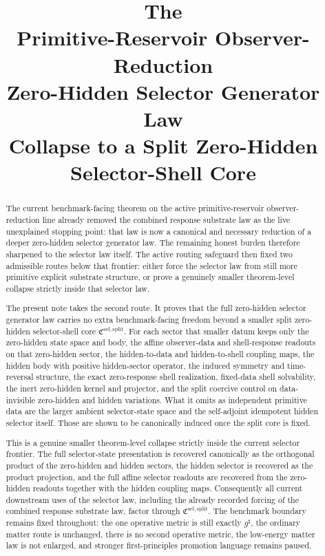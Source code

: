 \documentclass[11pt]{article}
\title{\textbf{The \TheoryName{}}\\[0.4em]
\large Primitive-Reservoir Observer-Reduction\\
\large Zero-Hidden Selector Generator Law\\
\large Collapse to a Split Zero-Hidden Selector-Shell Core}
\author{}
\date{}
\newcommand{\CompletedMetric}{g^{\sharp}}
\newcommand{\SelectorCore}{\mathfrak C^{\mathrm{sel,split}}}
\begin{document}
\maketitle

\begin{abstract}
The current benchmark-facing theorem on the active primitive-reservoir observer-reduction line already removed the combined response substrate law as the live unexplained stopping point: that law is now a canonical and necessary reduction of a deeper zero-hidden selector generator law. The remaining honest burden therefore sharpened to the selector law itself. The active routing safeguard then fixed two admissible routes below that frontier: either force the selector law from still more primitive explicit substrate structure, or prove a genuinely smaller theorem-level collapse strictly inside that selector law.

The present note takes the second route. It proves that the full zero-hidden selector generator law carries no extra benchmark-facing freedom beyond a smaller split zero-hidden selector-shell core \(\SelectorCore\). For each sector that smaller datum keeps only the zero-hidden state space and body, the affine observer-data and shell-response readouts on that zero-hidden sector, the hidden-to-data and hidden-to-shell coupling maps, the hidden body with positive hidden-sector operator, the induced symmetry and time-reversal structure, the exact zero-response shell realization, fixed-data shell solvability, the inert zero-hidden kernel and projector, and the split coercive control on data-invisible zero-hidden and hidden variations. What it omits as independent primitive data are the larger ambient selector-state space and the self-adjoint idempotent hidden selector itself. Those are shown to be canonically induced once the split core is fixed.

This is a genuine smaller theorem-level collapse strictly inside the current selector frontier. The full selector-state presentation is recovered canonically as the orthogonal product of the zero-hidden and hidden sectors, the hidden selector is recovered as the product projection, and the full affine selector readouts are recovered from the zero-hidden readouts together with the hidden coupling maps. Consequently all current downstream uses of the selector law, including the already recorded forcing of the combined response substrate law, factor through \(\SelectorCore\). The benchmark boundary remains fixed throughout: the one operative metric is still exactly \(\CompletedMetric\), the ordinary matter route is unchanged, there is no second operative metric, the low-energy matter law is not enlarged, and stronger first-principles promotion language remains paused.
\end{abstract}
\end{document}
